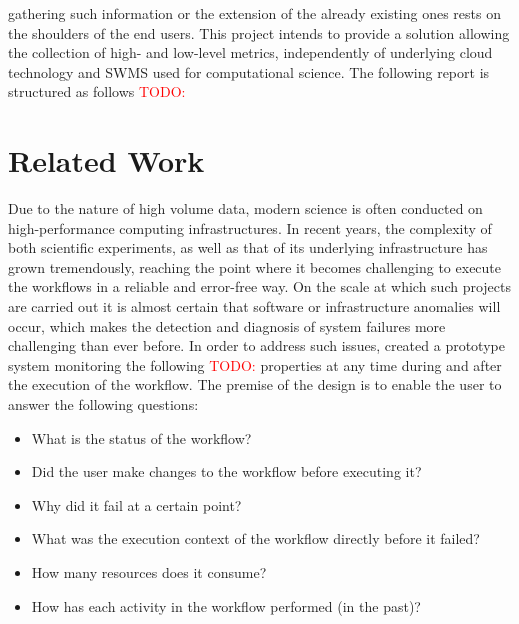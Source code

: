 \documentclass[a4paper,journal]{IEEEtran}
\newcommand{\todo}[1]{\textcolor{red}{TODO: #1}\PackageWarning{TODO:}{#1!}}
\begin{document}
gathering such information or the extension of the already existing ones rests on the shoulders of the end users. This project intends to provide a solution allowing the collection of high- and low-level metrics, independently of underlying cloud technology and SWMS used for computational science. The following report is structured as follows \todo{}
	
	
	\section{Related Work}
	Due to the nature of high volume data, modern science is often conducted on high-performance computing infrastructures. In recent years, the complexity of both scientific experiments, as well as that of its underlying infrastructure has grown tremendously, reaching the point where it becomes challenging to execute the workflows in a reliable and error-free way. On the scale at which such projects are carried out it is almost certain that software or infrastructure anomalies will occur, which makes the detection and diagnosis of system failures more challenging than ever before. In order to address such issues, \citeauthor{valerio2008capturingworkflowevent} created a prototype system monitoring the following \todo{} properties at any time during and after the execution of the workflow. The premise of the design is to enable the user to answer the following questions:
	
	\begin{itemize}
		\item What is the status of the workflow?
		\item Did the user make changes to the workflow before executing it?
		\item Why did it fail at a certain point?
		\item What was the execution context of the workflow directly before it failed?
		\item How many resources does it consume?
		\item How has each activity in the workflow performed (in the past)?
	\end{itemize}
	
\end{document}
